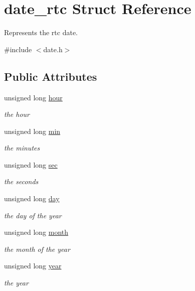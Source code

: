 \hypertarget{structdate__rtc}{}\section{date\+\_\+rtc Struct Reference}
\label{structdate__rtc}


Represents the rtc date.  




{\ttfamily \#include $<$date.\+h$>$}

\subsection*{Public Attributes}
\begin{DoxyCompactItemize}
\item 
unsigned long \hyperlink{structdate__rtc_a4a231dccac478c1e2eb419ee34535e0e}{hour}
\begin{DoxyCompactList}\small\item\em the hour \end{DoxyCompactList}\item 
unsigned long \hyperlink{structdate__rtc_a6ea5d53162f2139e1e2a8d59bd3083b9}{min}
\begin{DoxyCompactList}\small\item\em the minutes \end{DoxyCompactList}\item 
unsigned long \hyperlink{structdate__rtc_a4d0f917003e201fbfe662d4c91907645}{sec}
\begin{DoxyCompactList}\small\item\em the seconds \end{DoxyCompactList}\item 
unsigned long \hyperlink{structdate__rtc_aafb65ff718f63c0e56aff1168ab3c154}{day}
\begin{DoxyCompactList}\small\item\em the day of the year \end{DoxyCompactList}\item 
unsigned long \hyperlink{structdate__rtc_a12309edd1455518380682d3241cd4b75}{month}
\begin{DoxyCompactList}\small\item\em the month of the year \end{DoxyCompactList}\item 
unsigned long \hyperlink{structdate__rtc_abf8b053026cf0db4cc2d260ce9cce925}{year}
\begin{DoxyCompactList}\small\item\em the year \end{DoxyCompactList}\end{DoxyCompactItemize}


